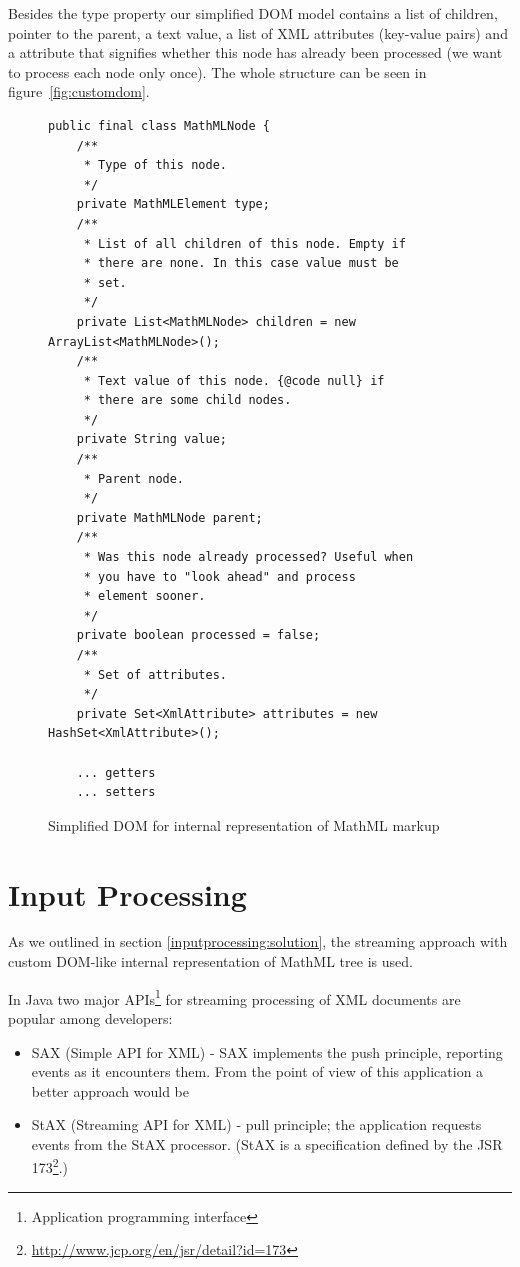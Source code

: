 \documentclass[11pt,oneside,final]{fithesis2}
\begin{document}
Besides the type property our simplified DOM model contains a list of children, pointer to the parent, a text value, a list of XML attributes (key-value pairs) and a attribute that signifies whether this node has already been processed (we want to process each node only once). The whole structure can be seen in figure~\vref{fig:customdom}.

\begin{figure}[!ht]
\begin{lstlisting}
public final class MathMLNode {
    /**
     * Type of this node.
     */
    private MathMLElement type;
    /**
     * List of all children of this node. Empty if 
     * there are none. In this case value must be 
     * set.
     */
    private List<MathMLNode> children = new ArrayList<MathMLNode>();
    /**
     * Text value of this node. {@code null} if 
     * there are some child nodes.
     */
    private String value;
    /**
     * Parent node.
     */
    private MathMLNode parent;
    /**
     * Was this node already processed? Useful when 
     * you have to "look ahead" and process
     * element sooner.
     */
    private boolean processed = false;
    /**
     * Set of attributes.
     */
    private Set<XmlAttribute> attributes = new HashSet<XmlAttribute>();
    
    ... getters
    ... setters
\end{lstlisting}
\caption{Simplified DOM for internal representation of MathML markup}
\label{fig:customdom}
\end{figure}

\section{Input Processing}
As we outlined in section \ref{inputprocessing:solution}, the streaming approach with custom DOM-like internal representation of MathML tree is used. 

In Java two major APIs\footnote{Application programming interface} for streaming processing of XML documents are popular among developers:
\begin{itemize}
\item SAX (Simple API for XML) - SAX implements the push principle, reporting events as it encounters them. From the point of view of this application a better approach would be
\item StAX (Streaming API for XML) - pull principle; the application requests events from the StAX processor. (StAX is a specification defined by the JSR 173\footnote{\url{http://www.jcp.org/en/jsr/detail?id=173}}.)
\end{itemize}
\end{document}
